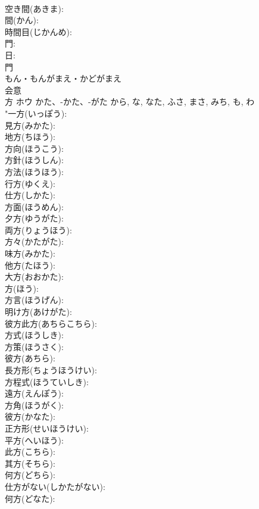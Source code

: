 \documentclass[8pt]{extreport}
\begin{document}
\begin{CJK}{UTF8}{min}
\\	空き間(あきま): 
\\	間(かん): 
\\	時間目(じかんめ): 
\\	門: 
\\	日: 
\\	門	
\\	もん・もんがまえ・かどがまえ	
\\	会意 
\\	方	ホウ	かた、-かた、-がた	から, な, なた, ふさ, まさ, みち, も, わ	
\\	"一方(いっぽう): 
\\	見方(みかた): 
\\	地方(ちほう): 
\\	方向(ほうこう): 
\\	方針(ほうしん): 
\\	方法(ほうほう): 
\\	行方(ゆくえ): 
\\	仕方(しかた): 
\\	方面(ほうめん): 
\\	夕方(ゆうがた): 
\\	両方(りょうほう): 
\\	方々(かたがた): 
\\	味方(みかた): 
\\	他方(たほう): 
\\	大方(おおかた): 
\\	方(ほう): 
\\	方言(ほうげん): 
\\	明け方(あけがた): 
\\	彼方此方(あちらこちら): 
\\	方式(ほうしき): 
\\	方策(ほうさく): 
\\	彼方(あちら): 
\\	長方形(ちょうほうけい): 
\\	方程式(ほうていしき): 
\\	遠方(えんぽう): 
\\	方角(ほうがく): 
\\	彼方(かなた): 
\\	正方形(せいほうけい): 
\\	平方(へいほう): 
\\	此方(こちら): 
\\	其方(そちら): 
\\	何方(どちら): 
\\	仕方がない(しかたがない): 
\\	何方(どなた): 

\end{CJK}
\end{document}

